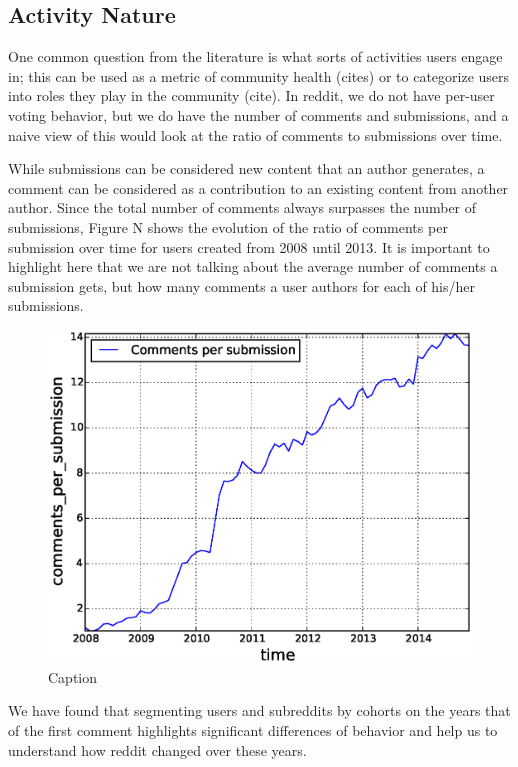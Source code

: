 \subsection{Activity Nature}

One common question from the literature is what sorts of activities users engage in; this can be used as a metric of community health (cites) or to categorize users into roles they play in the community (cite).  In reddit, we do not have per-user voting behavior, but we do have the number of comments and submissions, and a naive view of this would look at the ratio of comments to submissions over time.

While submissions can be considered new content that an author generates, a comment can be considered as a contribution to an existing content from another author. Since the total number of comments always surpasses the number of submissions, Figure N shows the evolution of the ratio of comments per submission over time for users created from 2008 until 2013. It is important to highlight here that we are not talking about the average number of comments a submission gets, but how many comments a user authors for each of his/her submissions.

\begin{figure}[!tb]
\centering
\includegraphics[scale=0.4]{./images/comments_per_submissions_over_time_total.eps}
\caption{Caption}
\label{fig:comments_per_submissions_over_time_total}
\end{figure}

We have found that segmenting users and subreddits by cohorts on the years that of the first comment highlights significant differences of behavior and help us to understand how reddit changed over these years.


